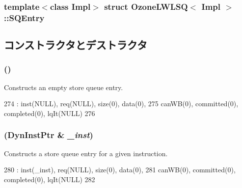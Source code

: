 \subsubsection*{template$<$class Impl$>$ struct OzoneLWLSQ$<$ Impl $>$::SQEntry}



\subsection{コンストラクタとデストラクタ}
\hypertarget{structOzoneLWLSQ_1_1SQEntry_a3e45ad78b5babe810aa50349be32637b}{
\subsubsection[{SQEntry}]{ ()}}
\label{structOzoneLWLSQ_1_1SQEntry_a3e45ad78b5babe810aa50349be32637b}
Constructs an empty store queue entry. 


\begin{DoxyCode}
274             : inst(NULL), req(NULL), size(0), data(0),
275               canWB(0), committed(0), completed(0), lqIt(NULL)
276         { }
\end{DoxyCode}
\hypertarget{structOzoneLWLSQ_1_1SQEntry_a3b163ba1f4e957334b0fe8a659562015}{
\subsubsection[{SQEntry}]{ ({\bf DynInstPtr} \& {\em \_\-inst})}}
\label{structOzoneLWLSQ_1_1SQEntry_a3b163ba1f4e957334b0fe8a659562015}
Constructs a store queue entry for a given instruction. 


\begin{DoxyCode}
280             : inst(_inst), req(NULL), size(0), data(0),
281               canWB(0), committed(0), completed(0), lqIt(NULL)
282         { }
\end{DoxyCode}



